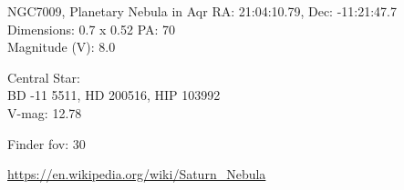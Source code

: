 \begin{block}{NGC7009, Planetary Nebula in Aqr}
    RA: 21:04:10.79, Dec: -11:21:47.7 \\ 
    Dimensions: 0.7 x 0.52 PA: 70 \\ 
    Magnitude (V): 8.0

    Central Star: \\ 
      \hspace{1em}BD -11 5511, HD 200516, HIP 103992 \\ 
      \hspace{1em}V-mag: 12.78 


    Finder fov: 30 

    \url{https://en.wikipedia.org/wiki/Saturn_Nebula} 
\end{block}